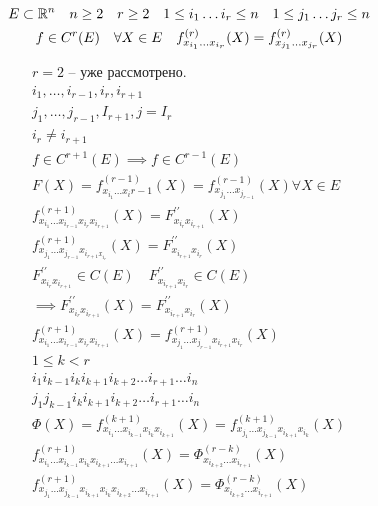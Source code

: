 \documentclass[main]{subfiles}
\begin{document}
    \begin{theorem}
        \begin{gather*}
            E \subset \mathbb{R}^n \quad n \geq 2 \quad r \geq 2 \quad 1 \leq i_1 \ldots i_r \leq n \quad 1 \leq j_1 \ldots j_r \leq n \\
            f \in C^r(E) \quad \forall X \in E \quad f^{(r)}_{x_{i_1} \ldots x_{i_r}}(X) = f^{(r)}_{x_{j_1} \ldots x_{j_r}}(X) 
        \end{gather*}
    \end{theorem}
        \begin{longProof}[по индукции]
            \begin{gather*}
                r = 2 \text{ -- уже  рассмотрено.} \\
                i_1, \ldots, i_{r-1}, i_r, i_{r+1} \\
                j_1, \ldots, j_{r-1}, I_{r+1}, j=I_r\\
                i_r \ne i_{r+1} \\
                f \in  C^{r+1}(E) \implies f \in C^{r-1}(E) \\
                F(X) = f^{(r-1)}_{x_{i_1} \ldots x_i{r-1}}(X) = f^{(r-1)}_{x_{j_1} \ldots x_{j_{r-1}}}(X) \forall X \in E \\
                f^{(r+1)}_{x_{i_1} \ldots x_{i_{r-1}} x_{i_r} x_{i_{r+1}}}(X) = F^{\prime\prime}_{x_{i_r} x_{i_{r+1}}}(X) \\
                f^{(r+1)}_{x_{j_1} \ldots x_{j_{r-1}} x_{i_{r+1} x_{i_r}}}(X) = F^{\prime\prime}_{x_{i_{r+1}} x_{i_r}}(X) \\
                F^{\prime\prime}_{x_{i_r} x_{i_{r+1}}} \in C(E) \quad F^{\prime\prime}_{x_{i_{r+1}}x_{i_r}} \in C(E) \\
                \implies F^{\prime\prime}_{x_{i_r}x_{i_{r+1}}}(X) = F^{\prime\prime}_{x_{i_{r+1}} x_{i_r}}(X) \\
                f^{(r+1)}_{x_{i_1} \ldots x_{i_{r-1}} x_{i_r} x_{i_{r+1}}}(X) =  f^{(r+1)}_{x_{j_1} \ldots x_{j_{r-1}} x_{i_{r+1}} x_{i_r}}(X) \\
                1 \leq k < r \\
                i_{1} i_{k-1} i_k i_{k+1} i_{k+2} \ldots i_{r+1} \ldots i_n \\
                j_{1} j_{k-1} i_k i_{k+1} i_{k+2} \ldots i_{r+1} \ldots i_n \\
                \Phi(X) = f^{(k+1)}_{x_{i_1} \ldots x_{i_{k-1}} x_{i_k} x_{i_{k+1}}}(X) = f^{(k+1)}_{x_{j_1} \ldots x_{j_{k-1}} x_{i_{k+1}} x_{i_k}}(X)  \\
                f^{(r+1)}_{x_{i_1} \ldots x_{i_{k-1}} x_{i_k} x_{i_{k+1}} \ldots x_{i_{r+1}}}(X) = \Phi^{(r-k)}_{x_{i_{k+2}} \ldots x_{i_{r+1}}}(X) \\ 
                f^{(r+1)}_{x_{j_1} \ldots x_{j_{k-1}}  x_{i_{k+1}} x_{i_k} x_{i_{k+2}}\ldots x_{i_{r+1}}}(X) = \Phi^{(r-k)}_{x_{i_{k+2}} \ldots x_{i_{r+1}}}(X) 
            \end{gather*}
        \end{longProof}
\end{document}
